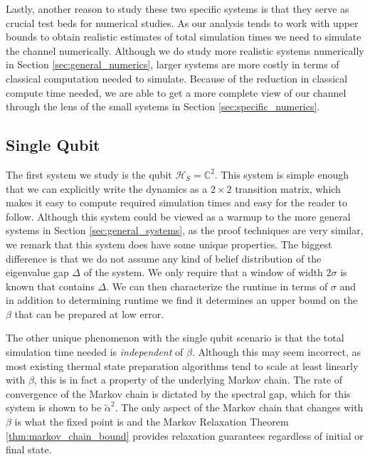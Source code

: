 \documentclass[
 amsmath,amssymb,
 aps,
onecolumn, 
nofootinbib]{revtex4-2}
\newcommand{\hilb}{\mathcal{H}}
\begin{document}
Lastly, another reason to study these two specific systems is that they serve as crucial test beds for numerical studies. As our analysis tends to work with upper bounds to obtain realistic estimates of total simulation times we need to simulate the channel numerically. Although we do study more realistic systems numerically in Section \ref{sec:general_numerics}, larger systems are more costly in terms of classical computation needed to simulate. Because of the reduction in classical compute time needed, we are able to get a more complete view of our channel through the lens of the small systems in Section \ref{sec:specific_numerics}.

\subsection{Single Qubit} \label{sec:single_qubit}
The first system we study is the qubit $\hilb_S = \mathbb{C}^2$. This system is simple enough that we can explicitly write the dynamics as a $2 \times 2$ transition matrix, which makes it easy to compute required simulation times and easy for the reader to follow. Although this system could be viewed as a warmup to the more general systems in Section \ref{sec:general_systems}, as the proof techniques are very similar, we remark that this system does have some unique properties. The biggest difference is that we do not assume any kind of belief distribution of the eigenvalue gap $\Delta$ of the system. We only require that a window of width $2 \sigma$ is known that contains $\Delta$. We can then characterize the runtime in terms of $\sigma$ and in addition to determining runtime we find it determines an upper bound on the $\beta$ that can be prepared at low error.

The other unique phenomenon with the single qubit scenario is that the total simulation time needed is \emph{independent} of $\beta$. Although this may seem incorrect, as most existing thermal state preparation algorithms tend to scale at least linearly with $\beta$, this is in fact a property of the underlying Markov chain. The rate of convergence of the Markov chain is dictated by the spectral gap, which for this system is shown to be $\widetilde{\alpha}^2$. The only aspect of the Markov chain that changes with $\beta$ is what the fixed point is and the Markov Relaxation Theorem \ref{thm:markov_chain_bound} provides relaxation guarantees regardless of initial or final state. 
\end{document}
